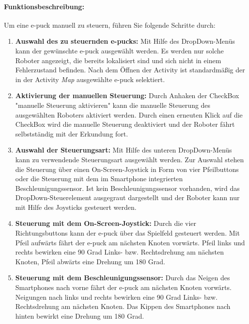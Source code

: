 \documentclass[10pt,a4paper]{article}
\begin{document}
 		\paragraph*{Funktionsbeschreibung:}
 		Um eine e-puck manuell zu steuern, führen Sie folgende Schritte durch:
 		\begin{enumerate}
 			\item \textbf{Auswahl des zu steuernden e-pucks:} Mit Hilfe des DropDown-Menüs kann der gewünschte e-puck ausgewählt werden. Es werden
 			nur solche Roboter angezeigt, die bereits lokalisiert sind und sich nicht in einem Fehlerzustand befinden. Nach dem Öffnen der Activity
 			ist standardmäßig der in der Activity \textit{Map} ausgewählte e-puck selektiert. 
 			\item \textbf{Aktivierung der manuellen Steuerung:} Durch Anhaken der CheckBox "manuelle Steuerung aktivieren" kann die manuelle 
 			Steuerung des ausgewählten Roboters aktiviert werden. Durch einen erneuten Klick auf die CheckBox wird die manuelle Steuerung deaktiviert
 			und der Roboter fährt selbstständig mit der Erkundung fort.
 			\item \textbf{Auswahl der Steuerungsart:} Mit Hilfe des unteren DropDown-Menüs kann zu verwendende Steuerungsart ausgewählt werden. Zur
 			Auswahl stehen die Steuerung über einen On-Screen-Joystick in Form von vier Pfeilbuttons oder die Steuerung mit dem im Smartphone
 			integrierten Beschleunigungssensor. Ist kein Beschleunigungssensor vorhanden, wird das DropDown-Steuerelement ausgegraut dargestellt und
 			der Roboter kann nur mit Hilfe des Joysticks gesteuert werden.
 			\item \textbf{Steuerung mit dem On-Screen-Joystick:} Durch die vier Richtungsbuttons kann der e-puck über das Spielfeld gesteuert werden.
 			Mit Pfeil aufwärts fährt der e-puck am nächsten Knoten vorwärts. Pfeil links und rechts bewirken eine 90 Grad Links- bzw. Rechtsdrehung
 			am nächsten Knoten, Pfeil abwärts eine Drehung um 180 Grad.
 			\item \textbf{Steuerung mit dem Beschleunigungssensor:}
 			Durch das Neigen des Smartphones nach vorne fährt der e-puck am nächsten Knoten vorwärts. Neigungen nach links und rechts bewirken eine
 			90 Grad Links- bzw. Rechtsdrehung am nächsten Knoten. Das Kippen des Smartphones nach hinten bewirkt eine Drehung um 180 Grad.
 		\end{enumerate}
\end{document}
